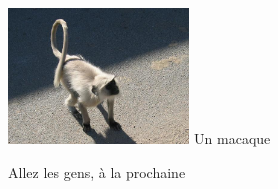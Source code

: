 \begin{multicols}{2}
\hspace*{-0.65cm}
\includegraphics[width=4.8cm]{articles/La-vie-en-inde/singe.jpg}
Un macaque

Allez les gens, à la prochaine

\end{multicols}


